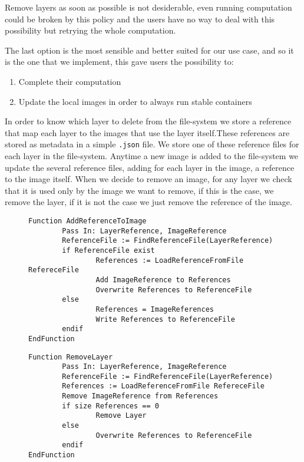 Remove layers as soon as possible is not desiderable, even running computation
could be broken by this policy and the users have no way to deal with this
possibility but retrying the whole computation.

The last option is the most sensible and better suited for our use case, and so
it is the one that we implement, this gave users the possibility to:
\begin{enumerate}
\item Complete their computation
\item Update the local images in order to always run stable containers
\end{enumerate}

In order to know which layer to delete from the file-system we store a
reference that map each layer to the images that use the layer itself.These
references are stored as metadata in a simple \texttt{.json} file.  We store
one of these reference files for each layer in the file-system.  Anytime a new
image is added to the file-system we update the several reference files,
adding for each layer in the image, a reference to the image itself.  When we
decide to remove an image, for any layer we check that it is used only by the
image we want to remove, if this is the case, we remove the layer, if it is not
the case we just remove the reference of the image.

\begin{figure}
\begin{lstlisting}[caption={Algorithm to add an image reference to the layer metadata}, label={lst:add-image-reference-to-layer}]
Function AddReferenceToImage
        Pass In: LayerReference, ImageReference
        ReferenceFile := FindReferenceFile(LayerReference)
        if ReferenceFile exist
                References := LoadReferenceFromFile RefereceFile
                Add ImageReference to References
                Overwrite References to ReferenceFile
        else 
                References = ImageReferences
                Write References to ReferenceFile
        endif
EndFunction
\end{lstlisting}
\end{figure}

\begin{figure}
\begin{lstlisting}[caption={Algorithm to remove an image from the file-system}, label={lst:remove-layer}]
Function RemoveLayer
        Pass In: LayerReference, ImageReference
        ReferenceFile := FindReferenceFile(LayerReference)
        References := LoadReferenceFromFile RefereceFile
        Remove ImageReference from References
        if size References == 0
                Remove Layer
        else
                Overwrite References to ReferenceFile
        endif
EndFunction
\end{lstlisting}
\end{figure}

